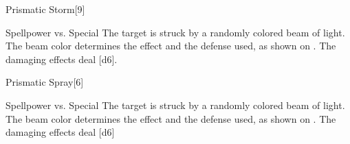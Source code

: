 \begin{spellsection}{Prismatic Storm}[9]
    \begin{spellheader}
    \end{spellheader}
    \begin{spellcontent}
        \begin{spelltargetinginfo}
        \end{spelltargetinginfo}
        \begin{spelleffects}
            \begin{spellattack}{Spellpower vs. Special}
                \spellspecial The target is struck by a randomly colored beam of light. The beam color determines the effect and the defense used, as shown on . The damaging effects deal [d6].
            \end{spellattack}
        \end{spelleffects}
    \end{spellcontent}
    \begin{spellfooter}
        \miscastyou
    \end{spellfooter}
\end{spellsection}

\begin{spellsection}{Prismatic Spray}[6]
    \begin{spellheader}
    \end{spellheader}
    \begin{spellcontent}
        \begin{spelltargetinginfo}
        \end{spelltargetinginfo}
        \begin{spelleffects}
            \begin{spellattack}{Spellpower vs. Special}
                \spellspecial The target is struck by a randomly colored beam of light. The beam color determines the effect and the defense used, as shown on . The damaging effects deal [d6]
            \end{spellattack}
        \end{spelleffects}
    \end{spellcontent}
    \begin{spellfooter}
        \miscastexplode
    \end{spellfooter}
\end{spellsection}

